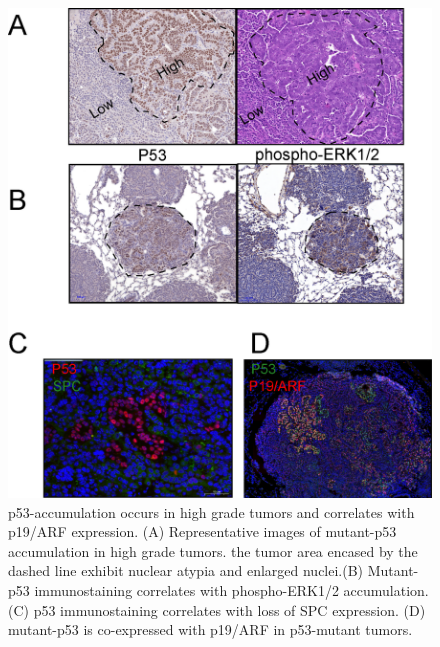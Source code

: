 \begin{figure}
\hypertarget{fig:3.6}{%
\centering
\includegraphics[width=1\textwidth,height=\textheight]{images/p53_5.png}
\caption{p53-accumulation occurs in high grade tumors and correlates with p19/ARF expression. (A) Representative images of mutant-p53 accumulation in high grade tumors. the tumor area encased by the dashed line exhibit nuclear atypia and enlarged nuclei.(B) Mutant-p53 immunostaining correlates with phospho-ERK1/2 accumulation. (C) p53 immunostaining correlates with loss of SPC expression. (D) mutant-p53 is co-expressed with p19/ARF in p53-mutant tumors.}\label{fig:3.6}
}
\end{figure}

